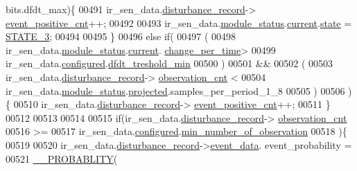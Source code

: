 \begin{DoxyCode}
      bits.dfdt\_max)\{
00491                ir\_sen\_data.\hyperlink{a00023_ac9b38e2c1d3f1013a88d33506c754152}{disturbance\_record}->
      \hyperlink{a00028_a7397b9d76d4b57500f27bb23d258a18a}{event\_positive\_cnt}++;
00492 
00493                ir\_sen\_data.\hyperlink{a00023_a5a53c391562b059eb744ac679f3765ca}{module\_status}.\hyperlink{a00017_ab8af48cdbba92b3ae39c4470e53af944}{current}.\hyperlink{a00017_a6b8d8e916bc56265a3fd279bd26b6d1b}{state} = 
      \hyperlink{a00021_ad87f1bc8466a25d9f7da68717d324a22}{STATE\_3};
00494 
00495              \}
00496              \textcolor{keywordflow}{else} \textcolor{keywordflow}{if}(
00497                      (
00498                      ir\_sen\_data.\hyperlink{a00023_a5a53c391562b059eb744ac679f3765ca}{module\_status}.\hyperlink{a00017_ab8af48cdbba92b3ae39c4470e53af944}{current}.
      \hyperlink{a00017_ad5c4f9a39d2a36632a53205ae8eb5a5d}{change\_per\_time}>
00499                      ir\_sen\_data.\hyperlink{a00023_a94b2d1f6ea4ab334c74d24984dd27843}{configured}.\hyperlink{a00021_a6f5257920e763b7f5f440bc0515cd963}{dfdt\_treshold\_min}
00500                      )
00501                      &&
00502                      (
00503                      ir\_sen\_data.\hyperlink{a00023_ac9b38e2c1d3f1013a88d33506c754152}{disturbance\_record}->
      \hyperlink{a00028_ad5b0bac02ce266b91b2b52a1c3ea1d78}{observation\_cnt} <
00504                      ir\_sen\_data.\hyperlink{a00023_a5a53c391562b059eb744ac679f3765ca}{module\_status}.\hyperlink{a00017_a6b2516d74583418cec324c50041421c9}{projected}.samples\_per\_period\_1\_8
00505                      )
00506                      )\{
00510                     ir\_sen\_data.\hyperlink{a00023_ac9b38e2c1d3f1013a88d33506c754152}{disturbance\_record}->
      \hyperlink{a00028_a7397b9d76d4b57500f27bb23d258a18a}{event\_positive\_cnt}++;
00511                    \}
00512             
00513 
00514 
00515                \textcolor{keywordflow}{if}(ir\_sen\_data.\hyperlink{a00023_ac9b38e2c1d3f1013a88d33506c754152}{disturbance\_record}->
      \hyperlink{a00028_ad5b0bac02ce266b91b2b52a1c3ea1d78}{observation\_cnt}
00516                 >=
00517                 ir\_sen\_data.\hyperlink{a00023_a94b2d1f6ea4ab334c74d24984dd27843}{configured}.\hyperlink{a00021_ae8665e8bf422c1482442d6949ba28408}{min\_number\_of\_observation}
00518                )\{
00519 
00520                     ir\_sen\_data.\hyperlink{a00023_ac9b38e2c1d3f1013a88d33506c754152}{disturbance\_record}->\hyperlink{a00028_a8c0bda69e71ef674e60da47ad0be9ab0}{event\_data}.
      event\_probability =
00521                            \hyperlink{a00021_ab2185512402ea26115af112ce48175b2}{\_\_PROBABLITY}(

\end{DoxyCode}
